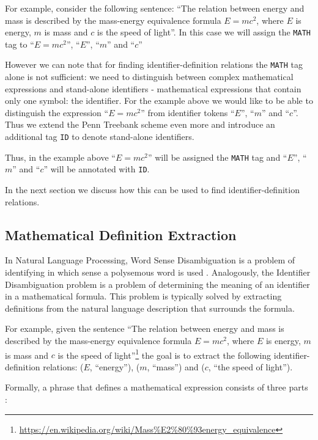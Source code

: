 For example, consider the following sentence:
``The relation between energy and mass is
described by  the mass-energy equivalence formula $E = mc^2$,
where $E$ is energy, $m$ is mass and $c$ is the speed of light''.
In this case we will assign the \verb|MATH| tag to ``$E = mc^2$'', ``$E$'',
``$m$'' and ``$c$''

However we can note that for finding identifier-definition relations
the \texttt{MATH} tag alone is not sufficient: we need to distinguish
between complex mathematical expressions and stand-alone identifiers -
mathematical expressions that contain only one symbol: the identifier.
For the example above we would like to be able to distinguish the
expression ``$E = mc^2$'' from identifier tokens ``$E$'',
``$m$'' and ``$c$''. Thus we extend the Penn Treebank scheme even more
and introduce an additional tag \texttt{ID} to denote stand-alone identifiers.


Thus, in the example above ``$E = mc^2$'' will be assigned the \texttt{MATH} tag
and ``$E$'', ``$m$'' and ``$c$'' will be annotated with \texttt{ID}.

In the next section we discuss how this can be used to find identifier-definition
relations.


\subsection{Mathematical Definition Extraction} \label{sec:definition-extraction-methods}

In Natural Language Processing, Word Sense Disambiguation is a problem of
identifying in which sense a polysemous word is used \cite{jurafsky2000speech}.
Analogously, the Identifier Disambiguation problem is a problem of
determining the meaning of an identifier in a mathematical formula. This
problem is typically solved by extracting definitions from the natural
language description that surrounds the formula.

For example, given the sentence ``The relation between energy and mass is
described by  the mass-energy equivalence formula $E = mc^2$,
where $E$ is energy, $m$ is mass and $c$ is the speed of
light''\footnote{\url{https://en.wikipedia.org/wiki/Mass\%E2\%80\%93energy\_equivalence}}
the goal is to extract the following identifier-definition relations:
($E$, ``energy''), ($m$, ``mass'') and ($c$, ``the speed of light'').

Formally, a phrase that defines a mathematical expression consists of three parts \cite{kristianto2012extracting}:

